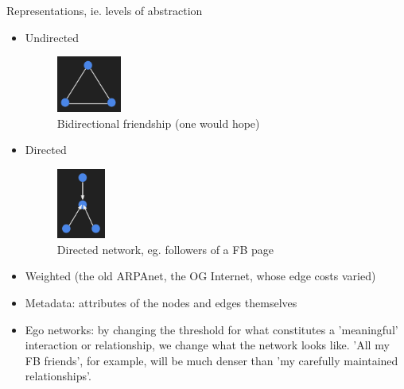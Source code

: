 Representations, ie. levels of abstraction
\begin{itemize}
	\item Undirected
    	\begin{figure}[ht]
    		\begin{center}
      	\includegraphics[width=0.2\textwidth]{figures/Undirected_friends.png}
      	\caption{
        	Bidirectional friendship (one would hope)}
    	\label{fig:figure3}
  			\end{center}
		\end{figure}
    \item Directed
    	\begin{figure}[ht]
    		\begin{center}
      	\includegraphics[width=0.15\textwidth]{figures/Directed_pg_followers.png}
      	\caption{
        	Directed network, eg. followers of a FB page}
    	\label{fig:figure4}
  			\end{center}
		\end{figure}
   \item Weighted (the old ARPAnet, the OG Internet, whose edge costs varied)
   \item Metadata: attributes of the nodes and edges themselves
   \item Ego networks: by changing the threshold for what constitutes a 'meaningful' interaction or relationship, we change what the network looks like. 'All my FB friends', for example, will be much denser than 'my carefully maintained relationships'.  
\end{itemize} 

